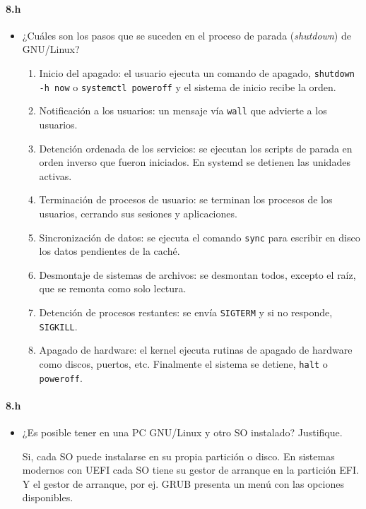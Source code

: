 \documentclass[10pt,a4paper]{paper}
\begin{document}
	
	\paragraph{8.h}
	\begin{itemize}
		\item ¿Cuáles son los pasos que se suceden en el proceso de parada
		(\textit{shutdown}) de GNU/Linux?
		
		
		\begin{enumerate}
			\item Inicio del apagado: el usuario ejecuta un comando de apagado,
			\texttt{shutdown -h now} o \texttt{systemctl poweroff} y el sistema de inicio
			recibe la orden.
			
			\item Notificación a los usuarios: un mensaje vía \texttt{wall} que advierte a
			los usuarios.
			
			\item Detención ordenada de los servicios: se ejecutan los scripts de parada
			en orden inverso que fueron iniciados. En systemd se detienen las unidades
			activas.
			
			\item Terminación de procesos de usuario: se terminan los procesos de los
			usuarios, cerrando sus sesiones y aplicaciones.
			
			\item Sincronización de datos: se ejecuta el comando \texttt{sync} para
			escribir en disco los datos pendientes de la caché.
			
			\item Desmontaje de sistemas de archivos: se desmontan todos, excepto el raíz,
			que se remonta como solo lectura.
			
			\item Detención de procesos restantes: se envía \texttt{SIGTERM} y si no
			responde, \texttt{SIGKILL}.
			
			\item Apagado de hardware: el kernel ejecuta rutinas de apagado de hardware
			como discos, puertos, etc. Finalmente el sistema se detiene, \texttt{halt} o
			\texttt{poweroff}.
			
		\end{enumerate}
		
	\end{itemize}
	
	
	
	
	\paragraph{8.h}
	\begin{itemize}
		\item ¿Es posible tener en una PC GNU/Linux y otro SO instalado? Justifique.
		
		Si, cada SO puede instalarse en su propia partición o disco. En sistemas
		modernos con UEFI cada SO tiene su gestor de arranque en la partición EFI. Y el
		gestor de arranque, por ej. GRUB presenta un menú con las opciones disponibles.
		
	\end{itemize}
	
\end{document}
